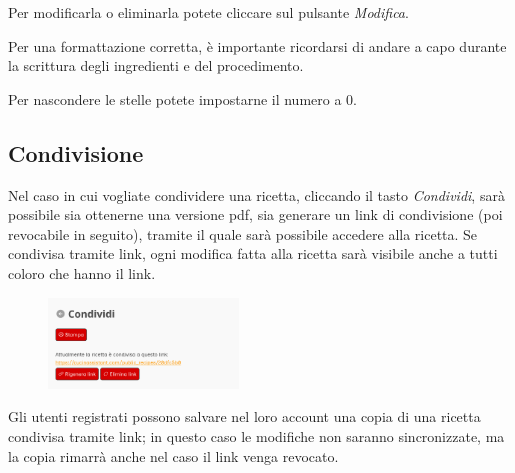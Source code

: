 \documentclass[12pt, a4paper]{article}
\begin{document}
    Per modificarla o eliminarla potete cliccare sul pulsante \emph{Modifica}.

    Per una formattazione corretta, è importante ricordarsi di andare a capo
    durante la scrittura degli ingredienti e del procedimento.

    Per nascondere le stelle potete impostarne il numero a 0.

	\subsection{Condivisione}

	Nel caso in cui vogliate condividere una ricetta, cliccando il tasto
    \emph{Condividi}, sarà possibile sia ottenerne una versione pdf, sia
    generare un link di condivisione (poi revocabile in seguito), tramite il
    quale sarà possibile accedere alla ricetta. Se condivisa tramite link, ogni
    modifica fatta alla ricetta sarà visibile anche a tutti coloro che hanno il
    link.

    \begin{figure}[H]
        \centering
        \includegraphics[width=0.45\textwidth]{assets/it/recipe_sharing.png}
    \end{figure}

	Gli utenti registrati possono salvare nel loro account una copia di una
    ricetta condivisa tramite link; in questo caso le modifiche non saranno
    sincronizzate, ma la copia rimarrà anche nel caso il link venga revocato.
\end{document}
